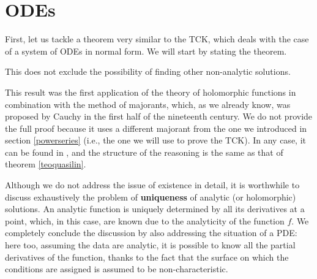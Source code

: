 \newpage
\section{ODEs}

First, let us tackle a theorem very similar to the TCK, which deals with the case of a system of ODEs in normal form. 
We will start by stating the theorem.

\begin{theorem}\label{teoedo}
{
}
\end{theorem}

\begin{remark}
This does not exclude the possibility of finding other non-analytic solutions.
\end{remark}

This result was the first application of the theory of holomorphic functions in combination with the method of majorants, which, as we already know, was proposed by Cauchy in the first half of the nineteenth century. 
We do not provide the full proof because it uses a different majorant from the one we introduced in section \ref{powerseries} (i.e., the one we will use to prove the TCK). 
In any case, it can be found in \cite{Delf}, and the structure of the reasoning is the same as that of theorem \ref{teoquasilin}.

Although we do not address the issue of existence in detail, it is worthwhile to discuss exhaustively the problem of \textbf{uniqueness} of analytic (or holomorphic) solutions. An analytic function is uniquely determined by all its derivatives at a point, which, in this case, are known due to the analyticity of the function $f$.
We completely conclude the discussion by also addressing the situation of a PDE: here too, assuming the data are analytic, it is possible to know all the partial derivatives of the function, thanks to the fact that the surface on which the conditions are assigned is assumed to be non-characteristic.

